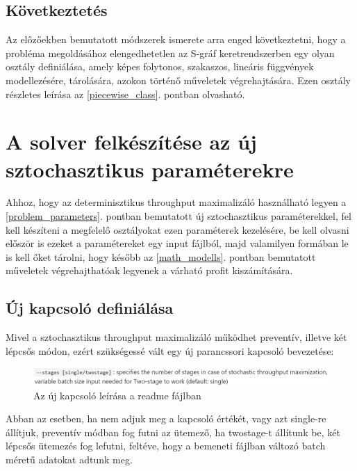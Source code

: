 \subsection{Következtetés} \label{piecewise_suggestion}
Az előzőekben bemutatott módszerek ismerete arra enged következtetni, hogy a probléma megoldásához elengedhetetlen az S-gráf keretrendszerben egy olyan osztály definiálása, amely képes  folytonos, szakaszos, lineáris függvények modellezésére, tárolására, azokon történő műveletek végrehajtására. Ezen osztály részletes leírása az \ref{piecewise_class}. pontban olvasható.
\section{A solver felkészítése az új sztochasztikus paraméterekre}
Ahhoz, hogy az determinisztikus throughput maximalizáló használható legyen a \ref{problem_parameters}. pontban bemutatott új sztochasztikus paraméterekkel, fel kell készíteni a megfelelő osztályokat ezen paraméterek kezelésére, be kell olvasni először is ezeket a paramétereket egy input fájlból, majd valamilyen formában le is kell őket tárolni, hogy később az \ref{math_modells}. pontban bemutatott műveletek végrehajthatóak legyenek a várható profit kiszámítására.
\subsection{Új kapcsoló definiálása}
Mivel a sztochasztikus throughput maximalizáló működhet preventív, illetve két lépcsős módon, ezért szükségessé vált egy új parancssori kapcsoló bevezetése:
\begin{figure}[H]
\begin{center}
\includegraphics[scale=0.38]{switch}
\caption{Az új kapcsoló leírása a readme fájlban}
\label{switch}
\end{center}
\end{figure}
Abban az esetben, ha nem adjuk meg a kapcsoló értékét, vagy azt single-re állítjuk, preventív módban fog futni az ütemező, ha twostage-t állítunk be, két lépcsős ütemezés fog lefutni, feltéve, hogy a bemeneti fájlban változó batch méretű adatokat adtunk meg.
